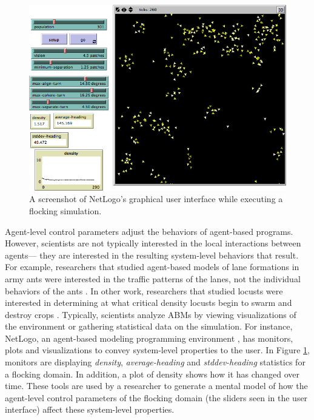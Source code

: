 \begin{figure}[ht]
\centering
\includegraphics[scale=.5]{images/netlogoui.png}
\caption{A screenshot of NetLogo's graphical user interface while executing a flocking simulation.}
\label{fig:netlogoui}
\end{figure}

Agent-level control parameters adjust the behaviors of agent-based programs.
However, scientists are not typically interested in the local interactions between agents--- they are interested in the resulting system-level behaviors that result.
For example, researchers that studied agent-based models of lane formations in army ants were interested in the traffic patterns of the lanes, not the individual behaviors of the ants \cite{couzin2003sol}.
In other work, researchers that studied locusts were interested in determining at what critical density locusts begin to swarm and destroy crops \cite{buhl2006dom}.
Typically, scientists analyze ABMs by viewing visualizations of the environment or gathering statistical data on the simulation.
For instance, NetLogo, an agent-based modeling programming environment \cite{tisue2004netlogo}, has monitors, plots and visualizations to convey system-level properties to the user.
In Figure \ref{fig:netlogoui}, monitors are displaying \textit{density}, \textit{average-heading} and \textit{stddev-heading} statistics for a flocking domain.
In addition, a plot of density shows how it has changed over time.
These tools are used by a researcher to generate a mental model of how the agent-level control parameters of the flocking domain (the sliders seen in the user interface) affect these system-level properties.

